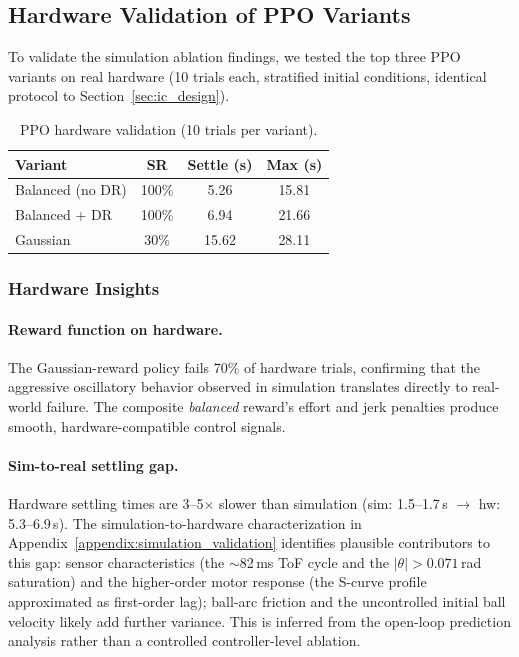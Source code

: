 \subsection{Hardware Validation of PPO Variants}
\label{appendix:ppo_hardware}

To validate the simulation ablation findings, we tested the top three PPO
variants on real hardware (10 trials each, stratified
initial conditions, identical protocol to Section~\ref{sec:ic_design}).

\begin{table}[!t]
\centering
\renewcommand{\arraystretch}{1.15}
\caption{PPO hardware validation (10 trials per variant).}
\label{tab:ppo_hardware}
\begin{tabular}{lccc}
\toprule
\textbf{Variant} & \textbf{SR} & \textbf{Settle (s)}
  & \textbf{Max (s)} \\
\midrule
Balanced (no DR) & 100\% & 5.26 & 15.81 \\
Balanced + DR    & 100\% & 6.94 & 21.66 \\
Gaussian         &  30\% & 15.62 & 28.11 \\
\bottomrule
\end{tabular}
\end{table}

\subsubsection{Hardware Insights}

\paragraph{Reward function on hardware.}
The Gaussian-reward policy fails 70\% of hardware trials, confirming
that the aggressive oscillatory behavior observed in simulation
translates directly to real-world failure.
The composite \emph{balanced} reward's effort and jerk penalties
produce smooth, hardware-compatible control signals.

\paragraph{Sim-to-real settling gap.}
Hardware settling times are 3--5$\times$ slower than simulation
(sim: 1.5--1.7\,s $\to$ hw: 5.3--6.9\,s).
The simulation-to-hardware characterization in
Appendix~\ref{appendix:simulation_validation} identifies plausible
contributors to this gap: sensor characteristics (the $\sim$82\,ms ToF cycle
and the $|\theta|>0.071$\,rad saturation) and the higher-order motor
response (the S-curve profile approximated as first-order lag); ball-arc
friction and the uncontrolled initial ball velocity likely add further
variance. This is inferred from the open-loop prediction analysis rather
than a controlled controller-level ablation.

